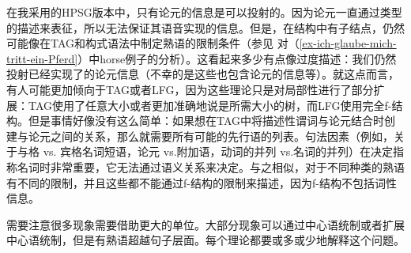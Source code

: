 在我采用的HPSG版本中，只有论元的信息是可以投射的。因为论元一直通过类型的描述来表征，所以无法保证其语音实现的信息。但是，在结构中有子结点，仍然可能像在TAG和构式语法中制定熟语的限制条件（参见 对（\ref{ex-ich-glaube-mich-tritt-ein-Pferd}）中horse例子的分析）。这看起来多少有点像过度描述：我们仍然投射已经实现了的论元信息（不幸的是这些也包含论元的信息等）。就这点而言，有人可能更加倾向于TAG或者LFG，因为这些理论只是对局部性进行了部分扩展：TAG使用了任意大小或者更加准确地说是所需大小的树，而LFG使用完全f-结构。但是事情好像没有这么简单：如果想在TAG中将描述性谓词与论元结合时创建与论元之间的关系，那么就需要所有可能的先行语的列表。句法因素（例如，关于与格 vs. 宾格名词短语，论元 vs.附加语，动词的并列 vs.名词的并列）在决定指称名词时非常重要，它无法通过语义关系来决定。与之相似，对于不同种类的熟语有不同的限制，并且这些都不能通过f-结构的限制来描述，因为f-结构不包括词性信息。

需要注意很多现象需要借助更大的单位。大部分现象可以通过中心语统制或者扩展中心语统制，但是有熟语超越句子层面。每个理论都要或多或少地解释这个问题。



